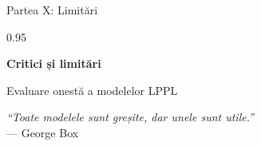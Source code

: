 \documentclass[9pt, aspectratio=169, t]{beamer}
\begin{document}
\begin{frame}{Partea X: Limitări}
    \begin{cminipage}{0.95\textwidth}
    \begin{center}
        {\LARGE\color{MainBlue}\textbf{Critici și limitări}}

        \vspace{8mm}
        {\large Evaluare onestă a modelelor LPPL}

        \vspace{8mm}
        \textit{``Toate modelele sunt greșite, dar unele sunt utile.''}\\
        --- George Box
    \end{center}
    \end{cminipage}
\end{frame}
\end{document}
